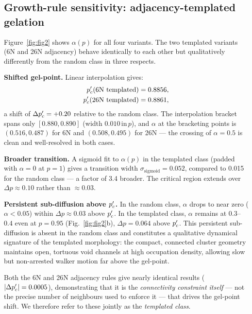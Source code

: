 \subsection{Growth-rule sensitivity: adjacency-templated gelation}
\label{sec:results_templated}

Figure~\ref{fig:fig2} shows $\alpha(p)$ for all four variants. The two templated variants (6N and 26N adjacency) behave identically to each other but qualitatively differently from the random class in three respects.

\textbf{Shifted gel-point.} Linear interpolation gives:
\begin{align}
  p_c'(\text{6N templated})  &= 0.8856, \nonumber \\
  p_c'(\text{26N templated}) &= 0.8861,
  \label{eq:pc_templated}
\end{align}
a shift of $\Delta p_c' = +0.20$ relative to the random class. The interpolation bracket spans only $[0.880, 0.890]$ (width $0.010\,\mathrm{in}\,p$), and $\alpha$ at the bracketing points is $(0.516, 0.487)$ for 6N and $(0.508, 0.495)$ for 26N — the crossing of $\alpha = 0.5$ is clean and well-resolved in both cases.

\textbf{Broader transition.} A sigmoid fit to $\alpha(p)$ in the templated class (padded with $\alpha = 0$ at $p = 1$) gives a transition width $\sigma_\mathrm{sigmoid} = 0.052$, compared to 0.015 for the random class — a factor of 3.4 broader. The critical region extends over $\Delta p \approx 0.10$ rather than $\approx 0.03$.

\textbf{Persistent sub-diffusion above $p_c'$.} In the random class, $\alpha$ drops to near zero ($\alpha < 0.05$) within $\Delta p \approx 0.03$ above $p_c'$. In the templated class, $\alpha$ remains at $0.3$--$0.4$ even at $p = 0.95$ (Fig.~\ref{fig:fig2}b), $\Delta p = 0.064$ above $p_c'$. This persistent sub-diffusion is absent in the random class and constitutes a qualitative dynamical signature of the templated morphology: the compact, connected cluster geometry maintains open, tortuous void channels at high occupation density, allowing slow but non-arrested walker motion far above the gel-point.

Both the 6N and 26N adjacency rules give nearly identical results ($|\Delta p_c'| = 0.0005$), demonstrating that it is the \emph{connectivity constraint itself} — not the precise number of neighbours used to enforce it — that drives the gel-point shift. We therefore refer to these jointly as the \emph{templated class}.

